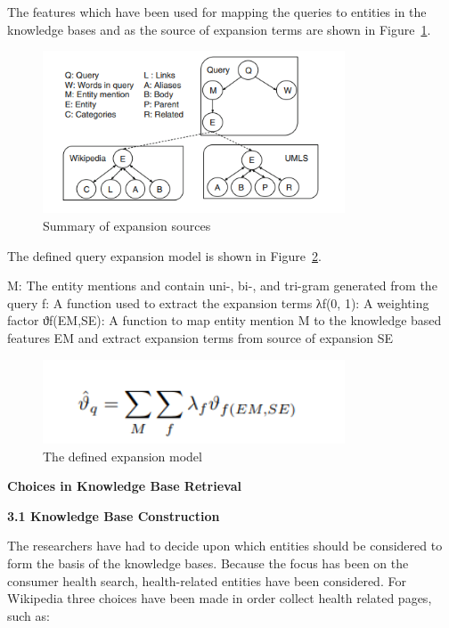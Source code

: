\documentclass[]{article}
\begin{document}
The features which have been used for mapping the queries to entities in the knowledge bases and as the source of expansion terms are shown in Figure~\ref{fig26}.

\begin{figure}[t!]
	\includegraphics[width=0.8\textwidth]{Capture26.png}
	\caption{Summary of expansion sources \label{fig26}}
\end{figure}      

The defined query expansion model is shown in Figure~\ref{fig27}.

M: The entity mentions and contain uni-, bi-, and tri-gram generated from the query
f: A function used to extract the expansion terms
λf(0, 1): A weighting factor
ϑf(EM,SE): A function to map entity mention M to the
knowledge based features EM and  extract
expansion terms from source of expansion SE  
 

\begin{figure}[b!]
	\includegraphics[width=0.8\textwidth]{Capture27.png}
	\caption{The defined expansion model \label{fig27}}
\end{figure}      

\textbf{ Choices in Knowledge Base Retrieval}

\textbf{3.1 Knowledge Base Construction} 

The researchers have had to decide upon which entities should be considered to form the basis of the knowledge bases. Because the focus has been on the consumer health search, health-related entities have been considered. For Wikipedia three choices have been made in order collect health related pages, such as:
    
\end{document}
